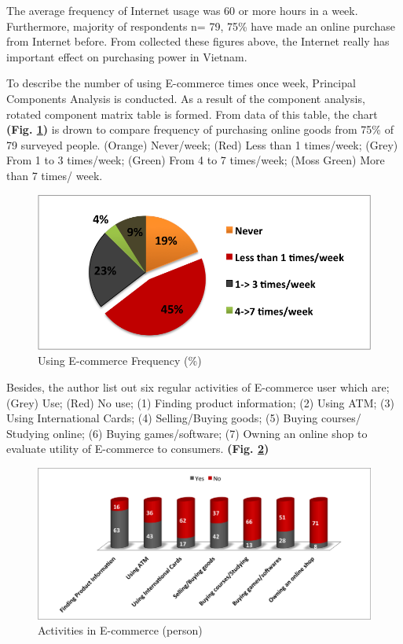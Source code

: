 \documentclass[conference]{IEEEtran}
\begin{document}
The average frequency of Internet usage was 60 or more hours in a week. Furthermore, majority of respondents n= 79, 75\% have made an online purchase from Internet before. From collected these figures above, the Internet really has important effect on purchasing power in Vietnam.

To describe the number of using E-commerce times once week, Principal Components Analysis is conducted. As a result of the component analysis, rotated component matrix table is formed. From data of this table, the chart \textbf{(Fig. \ref{fig:ecfreq})} is drown to compare frequency of purchasing online goods from 75\% of 79 surveyed people. (Orange) Never/week; (Red) Less than 1 times/week; (Grey) From 1 to 3 times/week; (Green) From 4 to 7 times/week; (Moss Green) More than 7 times/ week.

\begin{figure}[tbph]
\centering
\includegraphics[width=0.7\linewidth]{./ecfreq}
\caption{Using E-commerce Frequency (\%)}
\label{fig:ecfreq}
\end{figure}


Besides, the author list out six regular activities of E-commerce user which are; (Grey) Use; (Red) No use; (1) Finding product information; (2) Using ATM; (3) Using International Cards; (4) Selling/Buying goods; (5) Buying courses/ Studying online; (6) Buying games/software; (7) Owning an online shop to evaluate utility of E-commerce to consumers. \textbf{(Fig. \ref{fig:ecactivities})}

\begin{figure}[tbph]
\centering
\includegraphics[width=0.7\linewidth]{./ecactivities}
\caption{Activities in E-commerce (person)}
\label{fig:ecactivities}
\end{figure}
\end{document}

